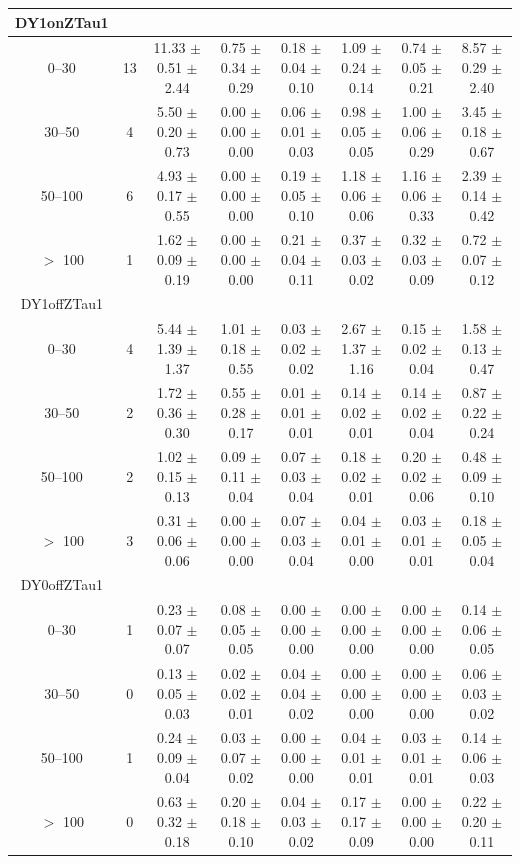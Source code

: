 \begin{table}[htp]
\begin{center}
\begin{tabular}{|c|c|c|ccccc|}
\hline
DY1onZTau1\\
\hline
0--30 & 13 & 11.33 $\pm$ 0.51 $\pm$ 2.44 & 0.75 $\pm$ 0.34 $\pm$ 0.29 & 0.18 $\pm$ 0.04 $\pm$ 0.10 & 1.09 $\pm$ 0.24 $\pm$ 0.14 & 0.74 $\pm$ 0.05 $\pm$ 0.21 & 8.57 $\pm$ 0.29 $\pm$ 2.40 \\
30--50 & 4 & 5.50 $\pm$ 0.20 $\pm$ 0.73 & 0.00 $\pm$ 0.00 $\pm$ 0.00 & 0.06 $\pm$ 0.01 $\pm$ 0.03 & 0.98 $\pm$ 0.05 $\pm$ 0.05 & 1.00 $\pm$ 0.06 $\pm$ 0.29 & 3.45 $\pm$ 0.18 $\pm$ 0.67 \\
50--100 & 6 & 4.93 $\pm$ 0.17 $\pm$ 0.55 & 0.00 $\pm$ 0.00 $\pm$ 0.00 & 0.19 $\pm$ 0.05 $\pm$ 0.10 & 1.18 $\pm$ 0.06 $\pm$ 0.06 & 1.16 $\pm$ 0.06 $\pm$ 0.33 & 2.39 $\pm$ 0.14 $\pm$ 0.42 \\
$>$ 100 & 1 & 1.62 $\pm$ 0.09 $\pm$ 0.19 & 0.00 $\pm$ 0.00 $\pm$ 0.00 & 0.21 $\pm$ 0.04 $\pm$ 0.11 & 0.37 $\pm$ 0.03 $\pm$ 0.02 & 0.32 $\pm$ 0.03 $\pm$ 0.09 & 0.72 $\pm$ 0.07 $\pm$ 0.12 \\
\hline
DY1offZTau1\\
\hline
0--30 & 4 & 5.44 $\pm$ 1.39 $\pm$ 1.37 & 1.01 $\pm$ 0.18 $\pm$ 0.55 & 0.03 $\pm$ 0.02 $\pm$ 0.02 & 2.67 $\pm$ 1.37 $\pm$ 1.16 & 0.15 $\pm$ 0.02 $\pm$ 0.04 & 1.58 $\pm$ 0.13 $\pm$ 0.47 \\
30--50 & 2 & 1.72 $\pm$ 0.36 $\pm$ 0.30 & 0.55 $\pm$ 0.28 $\pm$ 0.17 & 0.01 $\pm$ 0.01 $\pm$ 0.01 & 0.14 $\pm$ 0.02 $\pm$ 0.01 & 0.14 $\pm$ 0.02 $\pm$ 0.04 & 0.87 $\pm$ 0.22 $\pm$ 0.24 \\
50--100 & 2 & 1.02 $\pm$ 0.15 $\pm$ 0.13 & 0.09 $\pm$ 0.11 $\pm$ 0.04 & 0.07 $\pm$ 0.03 $\pm$ 0.04 & 0.18 $\pm$ 0.02 $\pm$ 0.01 & 0.20 $\pm$ 0.02 $\pm$ 0.06 & 0.48 $\pm$ 0.09 $\pm$ 0.10 \\
$>$ 100 & 3 & 0.31 $\pm$ 0.06 $\pm$ 0.06 & 0.00 $\pm$ 0.00 $\pm$ 0.00 & 0.07 $\pm$ 0.03 $\pm$ 0.04 & 0.04 $\pm$ 0.01 $\pm$ 0.00 & 0.03 $\pm$ 0.01 $\pm$ 0.01 & 0.18 $\pm$ 0.05 $\pm$ 0.04 \\
\hline
DY0offZTau1\\
\hline
0--30 & 1 & 0.23 $\pm$ 0.07 $\pm$ 0.07 & 0.08 $\pm$ 0.05 $\pm$ 0.05 & 0.00 $\pm$ 0.00 $\pm$ 0.00 & 0.00 $\pm$ 0.00 $\pm$ 0.00 & 0.00 $\pm$ 0.00 $\pm$ 0.00 & 0.14 $\pm$ 0.06 $\pm$ 0.05 \\
30--50 & 0 & 0.13 $\pm$ 0.05 $\pm$ 0.03 & 0.02 $\pm$ 0.02 $\pm$ 0.01 & 0.04 $\pm$ 0.04 $\pm$ 0.02 & 0.00 $\pm$ 0.00 $\pm$ 0.00 & 0.00 $\pm$ 0.00 $\pm$ 0.00 & 0.06 $\pm$ 0.03 $\pm$ 0.02 \\
50--100 & 1 & 0.24 $\pm$ 0.09 $\pm$ 0.04 & 0.03 $\pm$ 0.07 $\pm$ 0.02 & 0.00 $\pm$ 0.00 $\pm$ 0.00 & 0.04 $\pm$ 0.01 $\pm$ 0.01 & 0.03 $\pm$ 0.01 $\pm$ 0.01 & 0.14 $\pm$ 0.06 $\pm$ 0.03 \\
$>$ 100 & 0 & 0.63 $\pm$ 0.32 $\pm$ 0.18 & 0.20 $\pm$ 0.18 $\pm$ 0.10 & 0.04 $\pm$ 0.03 $\pm$ 0.02 & 0.17 $\pm$ 0.17 $\pm$ 0.09 & 0.00 $\pm$ 0.00 $\pm$ 0.00 & 0.22 $\pm$ 0.20 $\pm$ 0.11 \\
\hline
\end{tabular}
\end{center}
\end{table}